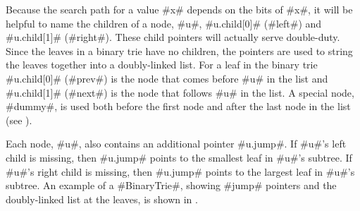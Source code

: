Because the search path
%
for a value #x# depends on the bits of #x#, it will
be helpful to name the children of a node, #u#, #u.child[0]# (#left#)
and #u.child[1]# (#right#).  These child pointers will actually serve
double-duty.  Since the leaves in a binary trie have no children, the
pointers are used to string the leaves together into a doubly-linked list.
For a leaf in the binary trie #u.child[0]# (#prev#) is the node that
comes before #u# in the list and #u.child[1]# (#next#) is the node that
follows #u# in the list.  A special node, #dummy#, is used both before
the first node and after the last node in the list (see ).

Each node, #u#, also contains an additional pointer #u.jump#.  If #u#'s
left child is missing, then #u.jump# points to the smallest leaf in
#u#'s subtree.  If #u#'s right child is missing, then #u.jump# points
to the largest leaf in #u#'s subtree.  An example of a #BinaryTrie#,
showing #jump# pointers and the doubly-linked list at the leaves, is
shown in .

